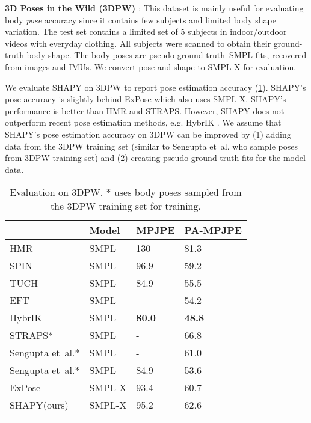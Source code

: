 \documentclass[10pt,twocolumn,letterpaper]{article}
\newcommand{\qheading}[1]{\noindent\textbf{#1}:}
\newcommand{\TODO}[1]{\xspace{\color{red} #1}\xspace}
\renewcommand{\TODO}[1]{\xspace{\color{black} #1}\xspace}
\newcommand{\lookat}[1]{\xspace{\color{black} #1}\xspace}
\newcommand{\modelCOLOR}{black}
\newcommand{\modelname}{{\color{\modelCOLOR}SHAPY}\xspace}
\newcommand{\expose}{\mbox{ExPose}\xspace}
\newcommand{\straps}{\mbox{STRAPS}\xspace}
\newcommand{\hybrik}{\mbox{HybrIK}\xspace}
\newcommand{\threeD}{3D\xspace}
\newcommand{\vspaceTABaboveCaption}{-0.0 em}
\newcommand{\hmr}{\mbox{HMR}\xspace}
\newcommand{\spin}{\mbox{SPIN}\xspace}
\newcommand{\smplx}{\mbox{SMPL-X}\xspace}
\newcommand{\smplX}{\smplx}
\newcommand{\groundtruth}{\mbox{ground-truth}\xspace}
\newcommand{\smpl}{\mbox{SMPL}\xspace}
\newcommand{\threedpw}{\mbox{3DPW}\xspace}
\renewcommand{\etal}{\mbox{et al.}\xspace}
\renewcommand{\eg}{\mbox{e.g.}\xspace}
\begin{document}
\begin{appendices}
\qheading{\threeD Poses in the Wild (\threedpw) \cite{vonMarcard2018}} 
This dataset is mainly useful for evaluating 
body \emph{pose} accuracy since it contains few subjects and limited body shape variation.
The test set contains a limited set of $5$ subjects in indoor/outdoor videos with everyday clothing. \TODO{All subjects were scanned to obtain their ground-truth body shape}. The body poses are pseudo \groundtruth~\smpl fits, recovered from images and IMUs. We convert pose and shape to \smplX for evaluation.

We evaluate \modelname on \threedpw to report pose estimation accuracy (\cref{tab:3dpw}). \modelname's pose accuracy is slightly behind \expose which also uses \smplX.  \lookat{\modelname's performance is better than \hmr \cite{Kanazawa2018_hmr} and \straps \cite{sengupta2020straps}. However, \modelname does not outperform recent pose estimation methods, \eg HybrIK \cite{li2021hybrik}. We assume that \modelname's pose estimation accuracy on \threedpw can be improved by (1) adding data from the \threedpw training set (similar to Sengupta \etal \cite{sengupta2021hierarchicalICCV} who sample poses from \threedpw training set) and (2) creating pseudo ground-truth fits for the model data.}

\begin{table}
\renewcommand{\arraystretch}{1.2} 
\centering
\scriptsize
\begin{tabular}{llll}
    \toprule
    & Model & MPJPE & PA-MPJPE \\
    \midrule
    \hmr    \cite{Kanazawa2018_hmr}                     & \smpl     & 130      & 81.3        \\
	\spin \cite{Kolotouros2019_spin}                    & \smpl     & 96.9     & 59.2        \\
	TUCH \cite{mueller2021tuch}                         & \smpl     & 84.9     & 55.5        \\
	EFT \cite{joo2020eft}                               & \smpl     & -        & 54.2        \\
    \hybrik \cite{li2021hybrik}                         & \smpl     & \textbf{80.0}     & \textbf{48.8}        \\
    \straps \cite{sengupta2020straps}*                   & \smpl     & -        & 66.8        \\
    Sengupta \etal \cite{sengupta2021probabilisticCVPR}* & \smpl     & -        & 61.0        \\
    Sengupta \etal \cite{sengupta2021hierarchicalICCV}*  & \smpl     & 84.9     & 53.6        \\
	\expose \cite{Choutas2020_expose}                   & \smplx    & 93.4     & 60.7        \\
    \modelname (ours)                                   & \smplx    & 95.2     & 62.6         \\ 
    \noalign{\smallskip}
    \bottomrule
\end{tabular}
\vspace{\vspaceTABaboveCaption}
\caption{Evaluation on \threedpw \cite{vonMarcard2018}. * uses body poses sampled from the \threedpw training set for training.
}
\label{tab:3dpw}
\end{table}
  

\end{appendices}
\end{document}
